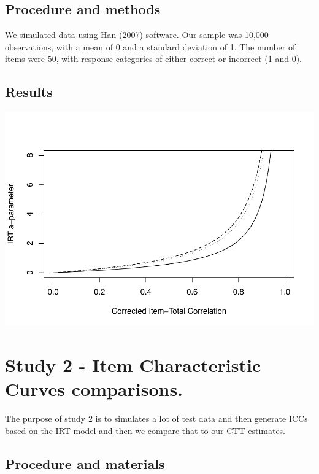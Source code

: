 \documentclass[
  english,
  man,floatsintext]{apa6}
\begin{document}
\hypertarget{procedure-and-methods}{%
\subsection{Procedure and methods}\label{procedure-and-methods}}

We simulated data using Han (2007) software. Our sample was 10,000 observations, with a mean of 0 and a standard deviation of 1. The number of items were 50, with response categories of either correct or incorrect (1 and 0).

\hypertarget{results}{%
\subsection{Results}\label{results}}

\includegraphics{ICC_project_files/figure-latex/acorrected simulation-1.pdf}
\newpage

\hypertarget{study-2---item-characteristic-curves-comparisons.}{%
\section{Study 2 - Item Characteristic Curves comparisons.}\label{study-2---item-characteristic-curves-comparisons.}}

The purpose of study 2 is to simulates a lot of test data and then generate ICCs based on the IRT model and then we compare that to our CTT estimates.

\hypertarget{procedure-and-materials}{%
\subsection{Procedure and materials}\label{procedure-and-materials}}
\end{document}
